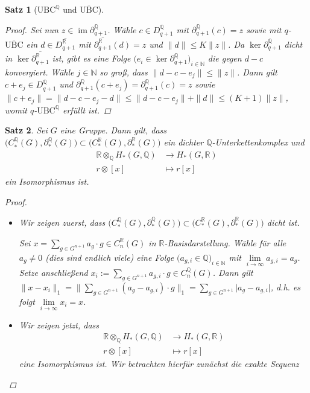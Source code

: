 \documentclass[a4paper,twoside,10pt]{scrreprt}
\DeclareMathOperator{\img}{im}
\newcommand{\UBC}{\text{UBC}}
\newcommand{\N}{\mathbb{N}}
\newcommand{\Q}{\mathbb{Q}}
\newcommand{\R}{\mathbb{R}}
\newtheorem{satz}{Satz}[section]
\theoremstyle{definition}
\begin{document}
\begin{satz}[$\UBC^{\Q}$ und $\overline{\UBC}$]
\begin{proof}
Sei nun $z\in \img \partial_{q+1}^{\Q}$. Wähle $c\in D_{q+1}^{\Q}$ mit $\partial_{q+1}^{\Q}(c)=z$ sowie mit $q$-$\overline{\UBC}$ ein $d\in \overline{D_{q+1}^{\R}}$ mit $\overline{\partial_{q+1}^{\R}}(d)=z$ und $\|d\|\leq K\|z\|$. Da $\ker \partial_{q+1}^{\Q}$ dicht in $\ker \overline{\partial_{q+1}^{\R}}$ ist, gibt es eine Folge $\bigl(e_i\in \ker \partial_{q+1}^{\Q}\bigr)_{i\in\N}$ die gegen $d-c$ konvergiert. Wähle $j\in \N$ so groß, dass $\|d-c-e_j\|\leq \|z\|$. Dann gilt $c+e_j\in D_{q+1}^{\Q}$ und $\partial_{q+1}^{\Q}(c+e_j)=\partial_{q+1}^{\Q}(c)=z$ sowie $\|c+e_j\|=\|d-c-e_j-d\|\leq \|d-c-e_j\|+\|d\|\leq (K+1)\|z\|$, womit $q$-$\UBC^{\Q}$ erfüllt ist.
\end{proof}
\end{satz}

\begin{satz}\label{satz:QFulfillsConditions}
Sei $G$ eine Gruppe.
Dann gilt, dass $\bigl(C_*^{\Q}(G),\partial_*^{\Q}(G)\bigr)\subset (C_*^{\R}(G),\partial_*^{\R}(G)\bigr)$ ein dichter $\Q$-Unterkettenkomplex und
\begin{align*}
\R\otimes_{\Q}H_*(G,\Q)&\to H_*(G,\R)\\
r\otimes [x] &\mapsto r[x]
\end{align*}
ein Isomorphismus ist.
\begin{proof}\hfill
\begin{itemize}
\item Wir zeigen zuerst, dass $\bigl(C_*^{\Q}(G),\partial_*^{\Q}(G)\bigr)\subset (C_*^{\R}(G),\partial_*^{\R}(G)\bigr)$ dicht ist.\par
Sei $x=\sum\limits_{g\in G^{n+1}} a_g\cdot g\in C_n^{\R}(G)$ in $\R$-Basisdarstellung. Wähle für alle $a_g\neq 0$ (dies sind endlich viele) eine Folge $\bigl(a_{g,i}\in \Q\bigr)_{i\in\N}$ mit $\lim\limits_{i\to \infty}a_{g,i}=a_g$. Setze anschließend $x_i:=\sum\limits_{g\in G^{n+1}}a_{g,i}\cdot g\in C_n^{\Q}(G)$. Dann gilt $\|x-x_i\|_1=\biggl\|\sum\limits_{g\in G^{n+1}}(a_g-a_{g,i})\cdot g\biggr\|_1=\sum\limits_{g\in G^{n+1}}\lvert a_g-a_{g,i}\rvert$, d.h. es folgt $\lim\limits_{i\to\infty}x_i=x$.
\item Wir zeigen jetzt, dass 
\begin{align*}
\R\otimes_{\Q}H_*(G,\Q)&\to H_*(G,\R)\\
r\otimes [x] &\mapsto r[x]
\end{align*} 
eine Isomorphismus ist. Wir betrachten hierfür zunächst die exakte Sequenz
\begin{center}
\begin{tikzpicture}

\end{tikzpicture}
\end{center}
\end{itemize}
\end{proof}
\end{satz}
\end{document}
